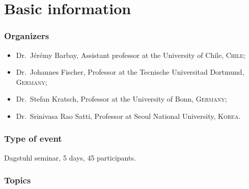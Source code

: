\documentclass[a4paper,10pt]{article}
\begin{document}


\section{Basic information}

\subsubsection*{ Organizers} 
\begin{itemize}
\item Dr.\ J\'er\'emy Barbay, Assistant professor at the University of Chile, \textsc{Chile};
\item Dr.\ Johannes Fischer, Professor at the Tecnische Universitad Dortmund, \textsc{Germany};
\item Dr.\ Stefan Kratsch,  Professor at the University of Bonn, \textsc{Germany};
\item Dr.\ Srinivasa Rao Satti, Professor at Seoul National  University,  \textsc{Korea}.
\end{itemize}

\subsubsection*{Type of event}
Dagstuhl seminar, 5 days, 45 participants. 


\subsubsection*{Topics}

\end{document}

